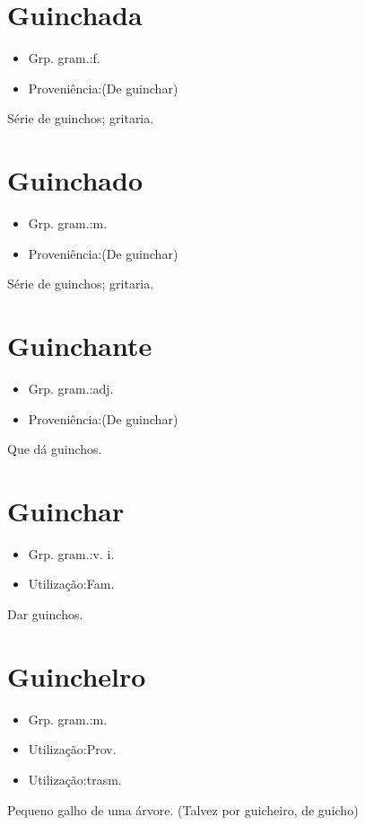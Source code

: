 \section{Guinchada}
\begin{itemize}
\item {Grp. gram.:f.}
\end{itemize}
\begin{itemize}
\item {Proveniência:(De \textunderscore guinchar\textunderscore )}
\end{itemize}
Série de guinchos; gritaria.
\section{Guinchado}
\begin{itemize}
\item {Grp. gram.:m.}
\end{itemize}
\begin{itemize}
\item {Proveniência:(De \textunderscore guinchar\textunderscore )}
\end{itemize}
Série de guinchos; gritaria.
\section{Guinchante}
\begin{itemize}
\item {Grp. gram.:adj.}
\end{itemize}
\begin{itemize}
\item {Proveniência:(De \textunderscore guinchar\textunderscore )}
\end{itemize}
Que dá guinchos.
\section{Guinchar}
\begin{itemize}
\item {Grp. gram.:v. i.}
\end{itemize}
\begin{itemize}
\item {Utilização:Fam.}
\end{itemize}
Dar guinchos.
\section{Guinchelro}
\begin{itemize}
\item {Grp. gram.:m.}
\end{itemize}
\begin{itemize}
\item {Utilização:Prov.}
\end{itemize}
\begin{itemize}
\item {Utilização:trasm.}
\end{itemize}
Pequeno galho de uma árvore.
(Talvez por \textunderscore guicheiro\textunderscore , de \textunderscore guicho\textunderscore )
